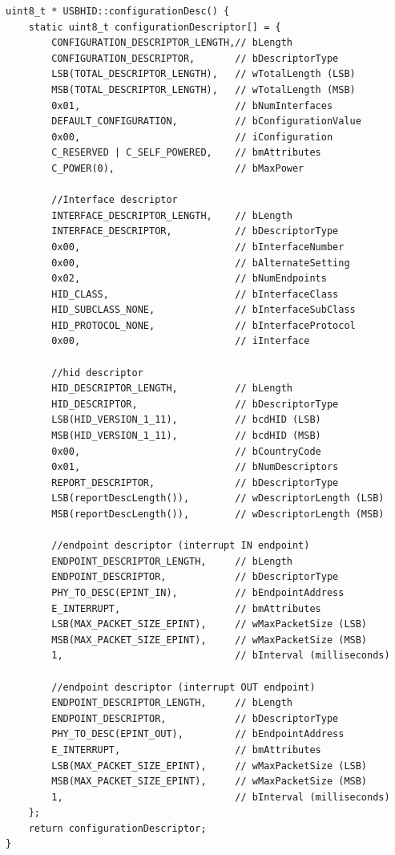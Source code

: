 \documentclass[pdftex,10pt,a4paper]{report}
\begin{document}
\begin{lstlisting}[label=HID Configuration Descriptor,caption=HID Configuration Descriptor]
uint8_t * USBHID::configurationDesc() {
    static uint8_t configurationDescriptor[] = {
        CONFIGURATION_DESCRIPTOR_LENGTH,// bLength
        CONFIGURATION_DESCRIPTOR,       // bDescriptorType
        LSB(TOTAL_DESCRIPTOR_LENGTH),   // wTotalLength (LSB)
        MSB(TOTAL_DESCRIPTOR_LENGTH),   // wTotalLength (MSB)
        0x01,                           // bNumInterfaces
        DEFAULT_CONFIGURATION,          // bConfigurationValue
        0x00,                           // iConfiguration
        C_RESERVED | C_SELF_POWERED,    // bmAttributes
        C_POWER(0),                     // bMaxPower

        //Interface descriptor
        INTERFACE_DESCRIPTOR_LENGTH,    // bLength
        INTERFACE_DESCRIPTOR,           // bDescriptorType
        0x00,                           // bInterfaceNumber
        0x00,                           // bAlternateSetting
        0x02,                           // bNumEndpoints
        HID_CLASS,                      // bInterfaceClass
        HID_SUBCLASS_NONE,              // bInterfaceSubClass
        HID_PROTOCOL_NONE,              // bInterfaceProtocol
        0x00,                           // iInterface

        //hid descriptor
        HID_DESCRIPTOR_LENGTH,          // bLength
        HID_DESCRIPTOR,                 // bDescriptorType
        LSB(HID_VERSION_1_11),          // bcdHID (LSB)
        MSB(HID_VERSION_1_11),          // bcdHID (MSB)
        0x00,                           // bCountryCode
        0x01,                           // bNumDescriptors
        REPORT_DESCRIPTOR,              // bDescriptorType
        LSB(reportDescLength()),        // wDescriptorLength (LSB)
        MSB(reportDescLength()),        // wDescriptorLength (MSB)

        //endpoint descriptor (interrupt IN endpoint)
        ENDPOINT_DESCRIPTOR_LENGTH,     // bLength
        ENDPOINT_DESCRIPTOR,            // bDescriptorType
        PHY_TO_DESC(EPINT_IN),          // bEndpointAddress
        E_INTERRUPT,                    // bmAttributes
        LSB(MAX_PACKET_SIZE_EPINT),     // wMaxPacketSize (LSB)
        MSB(MAX_PACKET_SIZE_EPINT),     // wMaxPacketSize (MSB)
        1,                              // bInterval (milliseconds)

        //endpoint descriptor (interrupt OUT endpoint)
        ENDPOINT_DESCRIPTOR_LENGTH,     // bLength
        ENDPOINT_DESCRIPTOR,            // bDescriptorType
        PHY_TO_DESC(EPINT_OUT),         // bEndpointAddress
        E_INTERRUPT,                    // bmAttributes
        LSB(MAX_PACKET_SIZE_EPINT),     // wMaxPacketSize (LSB)
        MSB(MAX_PACKET_SIZE_EPINT),     // wMaxPacketSize (MSB)
        1,                              // bInterval (milliseconds)
    };
    return configurationDescriptor;
}
\end{lstlisting}
\end{document}

